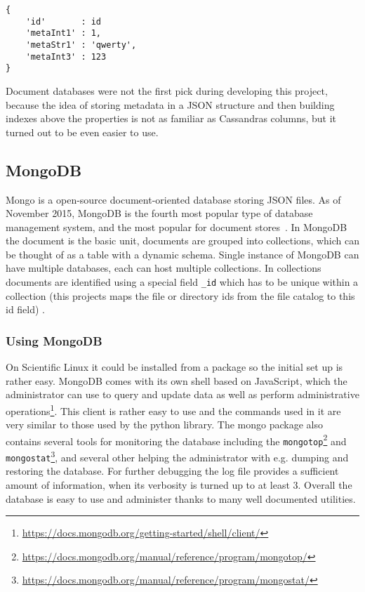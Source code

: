 \begin{verbatim}
{
	'id'       : id
	'metaInt1' : 1,
	'metaStr1' : 'qwerty',
	'metaInt3' : 123
}
\end{verbatim}


Document databases were not the first pick during developing this project, because the idea of
storing metadata in a JSON structure and then building indexes above the properties is not as
familiar as Cassandras columns, but it turned out to be even easier to use.

\subsection{MongoDB}

Mongo is a open-source document-oriented database storing JSON files. As of November 2015, MongoDB is the fourth 
most popular type of database management system, and the most popular for document stores~\cite{MongoPop}. 
In MongoDB the document is the basic unit, documents are grouped into collections, which can be thought of as 
a table with a dynamic schema. Single instance of MongoDB can have multiple databases, each can host multiple 
collections. In collections documents are identified using a special field \texttt{\_id} which has to be unique
within a collection\cite{MongoBook} (this projects maps the file or directory ids from the file catalog 
to this id field) .

\subsubsection{Using MongoDB}

On Scientific Linux it could be installed from a package so the initial set up is rather easy.
MongoDB comes with its own shell based on
JavaScript, which the administrator can use to query and update data as well as perform administrative 
operations\footnote{\url{https://docs.mongodb.org/getting-started/shell/client/}}. This client is rather easy to
use and the commands used in it are very similar to those used by the python library. The mongo
package also contains several tools for monitoring the database
including the \texttt{mongotop}\footnote{\url{https://docs.mongodb.org/manual/reference/program/mongotop/}} 
and \texttt{mongostat}\footnote{\url{https://docs.mongodb.org/manual/reference/program/mongostat/}}, and several 
other helping the administrator with e.g. dumping and restoring the database. For further 
debugging the log file provides a sufficient amount of information, when its verbosity is turned up to at least 3.
Overall the database is easy to use and administer thanks to many well documented utilities. 

